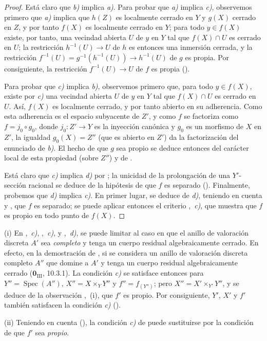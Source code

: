 \begin{proof}
Está claro que \emph{b)} implica \emph{a)}. Para probar que \emph{a)} implica \emph{c)}, observemos primero que \emph{a)} implica que $h(Z)$ es localmente cerrado en $Y$ y $g(X)$ cerrado en $Z$, y por tanto $f(X)$ es localmente cerrado en $Y$; para todo $y\in f(X)$ existe, por tanto, una vecindad abierta $U$
de $y$ en $Y$ tal que $f(X)\cap U$ es cerrado en $U$; la restricción $h^{-1}(U)\to U$ de $h$ es entonces una inmersión cerrada, y la restricción
$f^{-1}(U)=g^{-1}(h^{-1}(U))\to h^{-1}(U)$
de $g$ es propia. Por consiguiente, la restricción $f^{-1}(U)\to U$ de $f$ es propia ().

Para probar que \emph{c)} implica \emph{b)}, observemos primero que, para todo $y\in f(X)$, existe por \emph{c)} una vecindad abierta $U$ de $y$ en $Y$ tal que $f(X)\cap U$ es cerrado en $U$. Así, $f(X)$ es localmente cerrado, y por tanto abierto en su adherencia. Como esta adherencia es el espacio subyacente de $Z'$, y como $f$ se factoriza como $f=j_0\circ g_0$, donde $j_0:Z'\to Y$ es la inyección canónica y $g_0$ es un morfismo de $X$ en $Z'$, la igualdad $g_0(X)=Z''$ (que es abierto en $Z'$) da la factorización del enunciado de \emph{b)}. El hecho de que $g$ sea propio se deduce entonces del carácter local de esta propiedad (sobre $Z''$) y de .

Está claro que \emph{c)} implica \emph{d)} por ; la unicidad de la prolongación de una $Y'$-sección racional se deduce de la hipótesis de que $f$ es separado ().
Finalmente, probemos que \emph{d)} implica \emph{c)}. En primer lugar, se deduce de \emph{d)}, teniendo en cuenta  y , que $f$ es separado; se puede aplicar entonces el criterio ,~\emph{c)}, que muestra que $f$ es propio en todo punto de $f(X)$.
\end{proof}

\begin{remarks}[15.7.7]
\label{IV.15.7.7}
(i)
En ,~\emph{c)}, ,~\emph{c)}, y ,~\emph{d)}, se puede limitar al caso en que el anillo de valoración discreta $A'$ sea \emph{completo} y tenga un cuerpo residual algebraicamente cerrado.
En efecto, en la demostración de , si se considera un anillo de valoración discreta completo $A''$ que domine a $A'$ y tenga un cuerpo residual algebraicamente cerrado ($\mathbf{0}_{\mathrm{III}}$, 10.3.1). La condición \emph{c)} se satisface entonces para $Y''=\operatorname{Spec}(A'')$, $X''=X\times_Y Y''$ y $f''=f_{(Y'')}$; pero $X''=X'\times_{Y'}Y''$, y se deduce de la observación ,~(i), que $f'$ es propio. Por consiguiente, $Y'$, $X'$ y $f'$ también satisfacen la condición \emph{c)} ().

(ii)
Teniendo en cuenta (), la condición \emph{c)} de  puede sustituirse por la condición de que $f'$ sea \emph{propio}.
\end{remarks}

